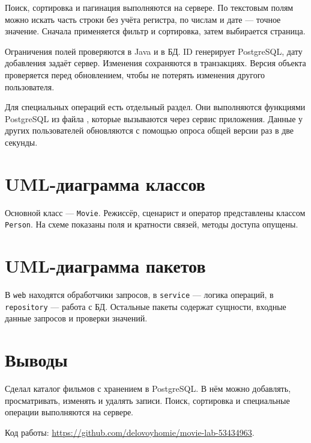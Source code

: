 \documentclass[12pt,a4paper]{article}
\begin{document}
Поиск, сортировка и пагинация выполняются на сервере. По текстовым полям можно искать часть строки без учёта регистра, по числам и дате — точное значение. Сначала применяется фильтр и сортировка, затем выбирается страница.

Ограничения полей проверяются в Java и в БД. ID генерирует PostgreSQL, дату добавления задаёт сервер. Изменения сохраняются в транзакциях. Версия объекта проверяется перед обновлением, чтобы не потерять изменения другого пользователя.

Для специальных операций есть отдельный раздел. Они выполняются функциями PostgreSQL из файла , которые вызываются через сервис приложения. Данные у других пользователей обновляются с помощью опроса общей версии раз в две секунды.

\clearpage
\section*{UML-диаграмма классов}

Основной класс — \texttt{Movie}. Режиссёр, сценарист и оператор представлены классом \texttt{Person}. На схеме показаны поля и кратности связей, методы доступа опущены.

\begin{center}

\end{center}

\clearpage
\section*{UML-диаграмма пакетов}

В \texttt{web} находятся обработчики запросов, в \texttt{service} — логика операций, в \texttt{repository} — работа с БД. Остальные пакеты содержат сущности, входные данные запросов и проверки значений.

\begin{center}

\end{center}

\section*{Выводы}

Сделал каталог фильмов с хранением в PostgreSQL. В нём можно добавлять, просматривать, изменять и удалять записи. Поиск, сортировка и специальные операции выполняются на сервере.

{\small Код работы: \url{https://github.com/delovoyhomie/movie-lab-53434963}.}
\end{document}
